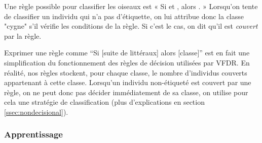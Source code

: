             Une règle possible pour classifier les oiseaux est « Si  et , alors . » Lorsqu'on tente de classifier un individu qui n'a pas d'étiquette, on lui attribue donc la classe "cygne" s'il vérifie les conditions de la règle. Si c'est le cas, on dit qu'il est \emph{couvert} par la règle.

            Exprimer une règle comme “Si [suite de littéraux] alors [classe]” est en fait une simplification du fonctionnement des règles de décision utilisées par VFDR. En réalité, nos règles stockent, pour chaque classe, le nombre d’individus couverts appartenant à cette classe. Lorsqu’un individu non-étiqueté est couvert par une règle, on ne peut donc pas décider immédiatement de sa classe, on utilise pour cela une stratégie de classification (plus d'explications en section \ref{ssec:nondecisional}). 


        \subsubsection{Apprentissage}\label{ssec:apprentissage}


